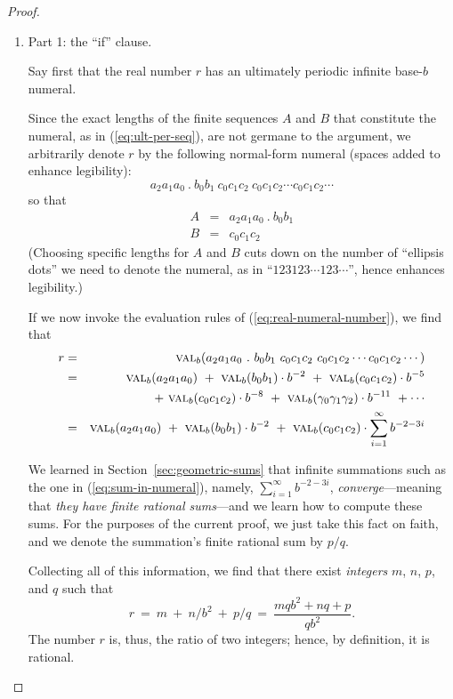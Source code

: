 \begin{proof}

\begin{enumerate}
\item 
{\small\sf Part 1: the ``if'' clause.}

Say first that the real number $r$ has an ultimately periodic infinite
base-$b$ numeral.

Since the exact lengths of the finite sequences $A$ and $B$ that
constitute the numeral, as in (\ref{eq:ult-per-seq}), are not germane
to the argument, we arbitrarily denote $r$ by the following
normal-form numeral (spaces added to enhance legibility):
\[  a_2 a_1 a_0 \ . \ b_0 b_1 \
c_0 c_1 c_2 \
c_0 c_1 c_2
\cdots
c_0 c_1 c_2
\cdots
\]
so that
\begin{eqnarray*}
A & = & a_2 a_1 a_0 \ . \ b_0 b_1 \\
B & = & c_0 c_1 c_2
\end{eqnarray*}
(Choosing specific lengths for $A$ and $B$ cuts down on the number of
``ellipsis dots'' we need to denote the numeral, as in ``$123 123
\cdots 123 \cdots$'', hence enhances legibility.)

If we now invoke the evaluation rules of (\ref{eq:real-numeral-number}),
we find that
\begin{eqnarray}
\nonumber
r & = &
\mbox{\sc val}_b(a_2 a_1 a_0 \ . \ b_0 b_1 \
c_0 c_1 c_2 \
c_0 c_1 c_2
\cdots
c_0 c_1 c_2
\cdots) \\
\nonumber
  & = &
\mbox{\sc val}_b(a_2 a_1 a_0)
 \ + \ \mbox{\sc val}_b(b_0 b_1) \cdot b^{-2}
 \ + \
\mbox{\sc val}_b(c_0 c_1 c_2) \cdot b^{-5} \\
\label{eq:sum-in-numeral}
  &  &
 \ + \
\mbox{\sc val}_b(c_0 c_1 c_2) \cdot b^{-8}
 \ + \
\mbox{\sc val}_b(\gamma_0 \gamma_1 \gamma_2) \cdot b^{-11}
\ + \cdots \\
\nonumber
  & = &
\mbox{\sc val}_b(a_2 a_1 a_0)
 \ + \ \mbox{\sc val}_b(b_0 b_1) \cdot b^{-2}
 \ + \
\mbox{\sc val}_b(c_0 c_1 c_2) \cdot \sum_{i=1}^\infty b^{-2-3i}
\end{eqnarray}

We learned in Section~\ref{sec:geometric-sums} that infinite
summations such as the one in (\ref{eq:sum-in-numeral}), namely,
$\sum_{i=1}^\infty b^{-2-3i}$, {\em converge}---meaning that {\em they
  have finite rational sums}---and we learn how to compute these sums.
For the purposes of the current proof, we just take this fact on
faith, and we denote the summation's finite rational sum by $p/q$.

Collecting all of this information, we find that there exist {\em
  integers} $m$, $n$, $p$, and $q$ such that
\[ r \ = \ m \ + \ n/ b^{2} \ + \ p/q \ = \
\frac{mqb^2 + nq + p}{qb^2}. \]
The number $r$ is, thus, the ratio of two integers; hence, by
definition, it is rational.


\end{enumerate}
\end{proof}
